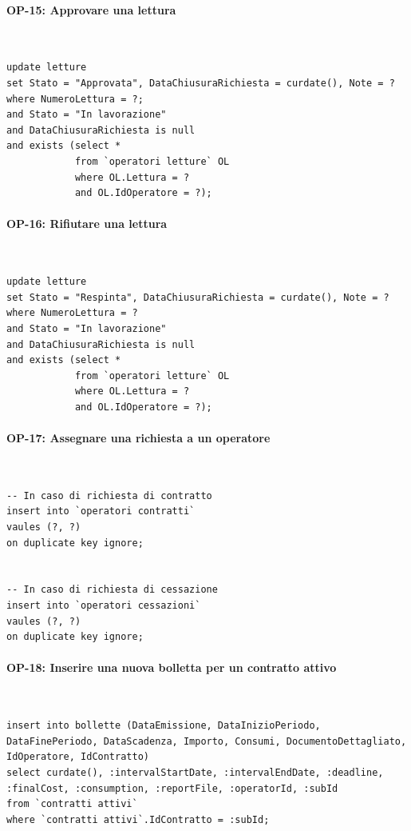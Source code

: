 \documentclass[a4paper,12pt]{report}
\begin{document}
\paragraph{OP-15: Approvare una lettura}\mbox{}\\
\begin{lstlisting}
update letture
set Stato = "Approvata", DataChiusuraRichiesta = curdate(), Note = ?
where NumeroLettura = ?;
and Stato = "In lavorazione"
and DataChiusuraRichiesta is null
and exists (select *
            from `operatori letture` OL
            where OL.Lettura = ?
            and OL.IdOperatore = ?);
\end{lstlisting}

\paragraph{OP-16: Rifiutare una lettura}\mbox{}\\
\begin{lstlisting}
update letture
set Stato = "Respinta", DataChiusuraRichiesta = curdate(), Note = ?
where NumeroLettura = ?
and Stato = "In lavorazione"
and DataChiusuraRichiesta is null
and exists (select *
            from `operatori letture` OL
            where OL.Lettura = ?
            and OL.IdOperatore = ?);
\end{lstlisting}

\paragraph{OP-17: Assegnare una richiesta a un operatore}\mbox{}\\
\begin{lstlisting}
-- In caso di richiesta di contratto
insert into `operatori contratti`
vaules (?, ?)
on duplicate key ignore;


-- In caso di richiesta di cessazione
insert into `operatori cessazioni`
vaules (?, ?)
on duplicate key ignore;
\end{lstlisting}
    
\paragraph{OP-18: Inserire una nuova bolletta per un contratto attivo}\mbox{}\\
\begin{lstlisting}
insert into bollette (DataEmissione, DataInizioPeriodo, DataFinePeriodo, DataScadenza, Importo, Consumi, DocumentoDettagliato, IdOperatore, IdContratto)
select curdate(), :intervalStartDate, :intervalEndDate, :deadline, :finalCost, :consumption, :reportFile, :operatorId, :subId
from `contratti attivi`
where `contratti attivi`.IdContratto = :subId;
\end{lstlisting}
\end{document}
